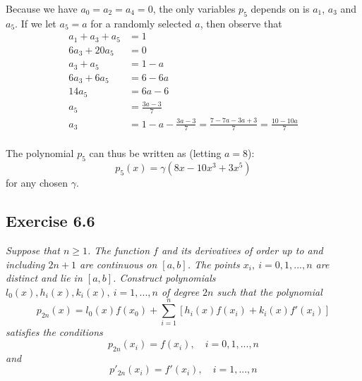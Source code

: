Because we have $a_0 = a_2 = a_4 = 0$, the only variables $p_5$ depends on is $a_1$, $a_3$ and $a_5$. If we let $a_5 = a$ for a randomly selected $a$, then observe that
\begin{align*}
    a_1 + a_3 + a_5 &= 1 \\
    6a_3 + 20a_5 &= 0 \\
    a_3 + a_5 &= 1 - a \\
    6a_3 + 6a_5 &= 6 - 6a \\
    14a_5 &= 6a - 6 \\
    a_5 &= \frac{3a - 3}{7} \\
    a_3 &= 1 - a - \frac{3a - 3}{7} = \frac{7 - 7a - 3a + 3}{7} = \frac{10 - 10a}{7} \\
\end{align*}

The polynomial $p_5$ can thus be written as (letting $a = 8$):
\begin{equation*}
    p_5(x) = \gamma \left(8x -10 x^3 + 3 x^5 \right)
\end{equation*}
for any chosen $\gamma$.



\subsection{Exercise 6.6}
\textit{Suppose that $n \ge 1$. The function $f$ and its derivatives of order up to and including $2n + 1$ are continuous on $[a, b]$. The points $x_i,\ i = 0, 1, ..., n$ are distinct and lie in $[a, b]$. Construct polynomials $l_0(x), h_i(x), k_i(x),\ i = 1, ..., n$ of degree $2n$ such that the polynomial}
\begin{equation*}
    p_{2n}(x) = l_0(x)f(x_0) + \sum_{i=1}^n \left[ h_i(x)f(x_i) + k_i(x)f'(x_i) \right]
\end{equation*}
\textit{satisfies the conditions}
\begin{equation}
\label{eq:3.6.6-cond1}
    p_{2n}(x_i) = f(x_i), \quad i = 0, 1, ..., n
\end{equation}
\textit{and}
\begin{equation}
\label{eq:3.6.6-cond2}
    p'_{2n}(x_i) = f'(x_i), \quad i = 1, ..., n
\end{equation}

